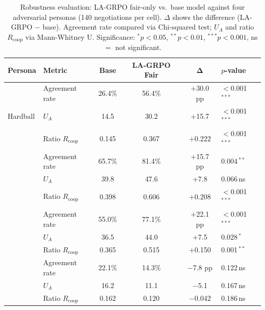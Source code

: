 \documentclass[12pt,a4paper]{article}
\renewcommand{\arraystretch}{1.25}
\begin{document}
\begin{table}[H]
\centering
\caption[Robustness: LA-GRPO fair-only vs.\ base.]{Robustness evaluation: LA-GRPO fair-only vs.\ base model against four adversarial personas (140 negotiations per cell). $\Delta$ shows the difference (LA-GRPO $-$ base). Agreement rate compared via Chi-squared test; $U_A$ and ratio $R_{\text{coop}}$ via Mann-Whitney U. Significance: $^* p < 0.05$, $^{**} p < 0.01$, $^{***} p < 0.001$, ns $=$ not significant.}
\label{tab:robustness}
\renewcommand{\arraystretch}{1.15}
\begin{tabular}{llcccl}
\toprule
\textbf{Persona} & \textbf{Metric} & \textbf{Base} & \textbf{LA-GRPO Fair} & $\boldsymbol{\Delta}$ & \textbf{$p$-value} \\
\midrule
\multirow{3}{*}{Hardball}
 & Agreement rate    & 26.4\% & 56.4\% & $+$30.0 pp & $<$0.001\,$^{***}$ \\
 & $U_A$             & 14.5   & 30.2   & $+$15.7    & $<$0.001\,$^{***}$ \\
 & Ratio $R_{\text{coop}}$ & 0.145 & 0.367 & $+$0.222 & $<$0.001\,$^{***}$ \\
\addlinespace
\multirow{3}{*}{Deceptive}
 & Agreement rate    & 65.7\% & 81.4\% & $+$15.7 pp & 0.004\,$^{**}$ \\
 & $U_A$             & 39.8   & 47.6   & $+$7.8     & 0.066\,ns \\
 & Ratio $R_{\text{coop}}$ & 0.398 & 0.606 & $+$0.208 & $<$0.001\,$^{***}$ \\
\addlinespace
\multirow{3}{*}{Anchoring}
 & Agreement rate    & 55.0\% & 77.1\% & $+$22.1 pp & $<$0.001\,$^{***}$ \\
 & $U_A$             & 36.5   & 44.0   & $+$7.5     & 0.028\,$^{*}$ \\
 & Ratio $R_{\text{coop}}$ & 0.365 & 0.515 & $+$0.150 & 0.001\,$^{**}$ \\
\addlinespace
\multirow{3}{*}{Stubborn}
 & Agreement rate    & 22.1\% & 14.3\% & $-$7.8 pp  & 0.122\,ns \\
 & $U_A$             & 16.2   & 11.1   & $-$5.1     & 0.167\,ns \\
 & Ratio $R_{\text{coop}}$ & 0.162 & 0.120 & $-$0.042 & 0.186\,ns \\
\bottomrule
\end{tabular}
\end{table}
\end{document}
